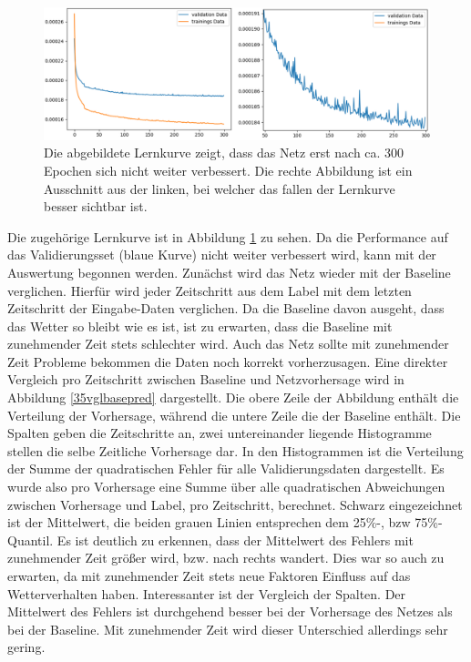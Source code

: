 \begin{figure}[h]
	\centering
	\includegraphics[width=\linewidth]{pics/lc_35minMSE.png}
	\caption[Lernkurve des UNet zur 35 Minuten Radar-Vorhersage.]{Die abgebildete Lernkurve zeigt, dass das Netz erst nach ca. 300 Epochen sich nicht weiter verbessert. Die rechte Abbildung ist ein Ausschnitt aus der linken, bei welcher das fallen der Lernkurve besser sichtbar ist.}
	\label{lc_35minMSE}
\end{figure}

Die zugehörige Lernkurve ist in Abbildung \ref{lc_35minMSE} zu sehen. Da die Performance auf das Validierungsset (blaue Kurve) nicht weiter verbessert wird, kann mit der Auswertung begonnen werden.
Zunächst wird das Netz wieder mit der Baseline verglichen. Hierfür wird jeder Zeitschritt aus dem Label mit dem letzten Zeitschritt der Eingabe-Daten verglichen. Da die Baseline davon ausgeht, dass das Wetter so bleibt wie es ist, ist zu erwarten, dass die Baseline mit zunehmender Zeit stets schlechter wird. Auch das Netz sollte mit zunehmender Zeit Probleme bekommen die Daten noch korrekt vorherzusagen. Eine direkter Vergleich pro Zeitschritt zwischen Baseline und Netzvorhersage wird in Abbildung \ref{35vglbasepred} dargestellt.
Die obere Zeile der Abbildung enthält die Verteilung der Vorhersage, während die untere Zeile die der Baseline enthält. Die Spalten geben die Zeitschritte an, zwei untereinander liegende Histogramme stellen die selbe Zeitliche Vorhersage dar. 
In den Histogrammen ist die Verteilung der Summe der quadratischen Fehler für alle Validierungsdaten dargestellt. Es wurde also pro Vorhersage eine Summe über alle quadratischen Abweichungen zwischen Vorhersage und Label, pro Zeitschritt, berechnet.
Schwarz eingezeichnet ist der Mittelwert, die beiden grauen Linien entsprechen dem 25\%-, bzw 75\%-Quantil. Es ist deutlich zu erkennen, dass der Mittelwert des Fehlers mit zunehmender Zeit größer wird, bzw. nach rechts wandert. Dies war so auch zu erwarten, da mit zunehmender Zeit stets neue Faktoren Einfluss auf das Wetterverhalten haben. Interessanter ist der Vergleich der Spalten. Der Mittelwert des Fehlers ist durchgehend besser bei der Vorhersage des Netzes als bei der Baseline. Mit zunehmender Zeit wird dieser Unterschied allerdings sehr gering.

